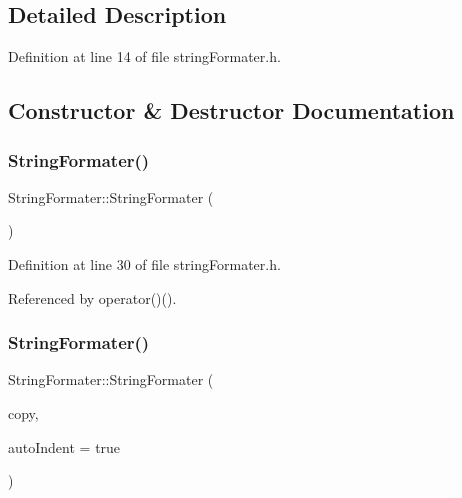 \subsection{Detailed Description}


Definition at line 14 of file string\+Formater.\+h.



\subsection{Constructor \& Destructor Documentation}
\mbox{\label{classStringFormater_abb1d26793e735b96a408f956daa43361}} 
\subsubsection{\texorpdfstring{String\+Formater()}{StringFormater()}\hspace{0.1cm}{\footnotesize\ttfamily [1/3]}}
{\footnotesize\ttfamily String\+Formater\+::\+String\+Formater (\begin{DoxyParamCaption}{ }\end{DoxyParamCaption})\hspace{0.3cm}{\ttfamily [inline]}}



Definition at line 30 of file string\+Formater.\+h.



Referenced by operator()().

\mbox{\label{classStringFormater_a91a7cfa34811723d7b934c1d22def6a8}} 
\subsubsection{\texorpdfstring{String\+Formater()}{StringFormater()}\hspace{0.1cm}{\footnotesize\ttfamily [2/3]}}
{\footnotesize\ttfamily String\+Formater\+::\+String\+Formater (\begin{DoxyParamCaption}\item[{const \hyperlink{classStringFormater}{String\+Formater} \&}]{copy,  }\item[{const bool \&}]{auto\+Indent = {\ttfamily true} }\end{DoxyParamCaption})\hspace{0.3cm}{\ttfamily [inline]}}



